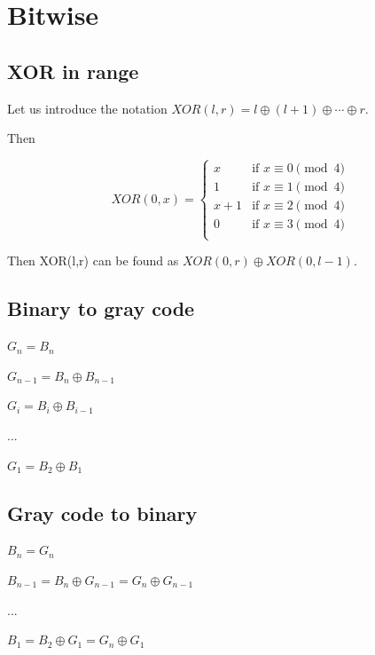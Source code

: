 \section{Bitwise}



\subsection{XOR in range}

Let us introduce the notation $XOR(l,r)=l \oplus (l+1) \oplus \cdots \oplus r$.

Then 

\begin{equation}
  XOR(0, x) =
  \begin{cases}
    x & \text{if } x \equiv 0 \pmod{4} \\
    1 & \text{if } x \equiv 1 \pmod{4} \\
    x + 1 & \text{if } x \equiv 2 \pmod{4} \\
    0 & \text{if } x \equiv 3 \pmod{4} \\
  \end{cases}
\end{equation}


Then XOR(l,r) can be found as $XOR(0,r) \oplus XOR(0,l−1)$.


\subsection{Binary to gray code}

$G_n = B_n$

$G_{n-1} = B_n \oplus B_{n-1} $

$G_{i} = B_i \oplus B_{i-1} $

$ ... $

$ G_1 = B_2 \oplus B_1 $

\subsection{Gray code to binary}


$ B_n = G_n $

$ B_{n-1} = B_n \oplus G_{n-1} = G_n \oplus G_{n-1} $

$ ... $

$ B_1 = B_2 \oplus G_1 = G_n \oplus G_1 $
